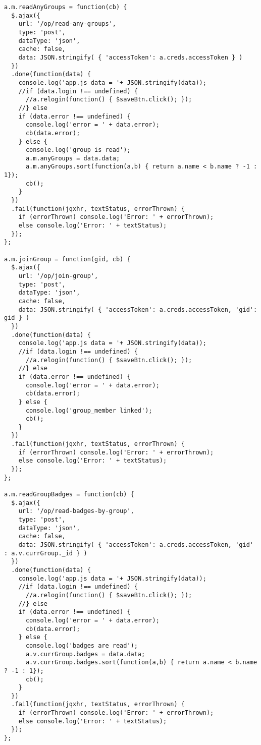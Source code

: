 \begin{lstlisting}
a.m.readAnyGroups = function(cb) { 
  $.ajax({
    url: '/op/read-any-groups',
    type: 'post',
    dataType: 'json',
    cache: false,
    data: JSON.stringify( { 'accessToken': a.creds.accessToken } )
  })
  .done(function(data) {
    console.log('app.js data = '+ JSON.stringify(data));
    //if (data.login !== undefined) {
      //a.relogin(function() { $saveBtn.click(); });
    //} else 
    if (data.error !== undefined) {
      console.log('error = ' + data.error);
      cb(data.error);
    } else {
      console.log('group is read');
      a.m.anyGroups = data.data;
      a.m.anyGroups.sort(function(a,b) { return a.name < b.name ? -1 : 1});
      cb();
    }
  })
  .fail(function(jqxhr, textStatus, errorThrown) {
    if (errorThrown) console.log('Error: ' + errorThrown);
    else console.log('Error: ' + textStatus);
  });
}; 

a.m.joinGroup = function(gid, cb) { 
  $.ajax({
    url: '/op/join-group',
    type: 'post',
    dataType: 'json',
    cache: false,
    data: JSON.stringify( { 'accessToken': a.creds.accessToken, 'gid': gid } )
  })
  .done(function(data) {
    console.log('app.js data = '+ JSON.stringify(data));
    //if (data.login !== undefined) {
      //a.relogin(function() { $saveBtn.click(); });
    //} else 
    if (data.error !== undefined) {
      console.log('error = ' + data.error);
      cb(data.error);
    } else {
      console.log('group_member linked');
      cb();
    }
  })
  .fail(function(jqxhr, textStatus, errorThrown) {
    if (errorThrown) console.log('Error: ' + errorThrown);
    else console.log('Error: ' + textStatus);
  });
}; 

a.m.readGroupBadges = function(cb) { 
  $.ajax({
    url: '/op/read-badges-by-group',
    type: 'post',
    dataType: 'json',
    cache: false,
    data: JSON.stringify( { 'accessToken': a.creds.accessToken, 'gid' : a.v.currGroup._id } )
  })
  .done(function(data) {
    console.log('app.js data = '+ JSON.stringify(data));
    //if (data.login !== undefined) {
      //a.relogin(function() { $saveBtn.click(); });
    //} else 
    if (data.error !== undefined) {
      console.log('error = ' + data.error);
      cb(data.error);
    } else {
      console.log('badges are read');
      a.v.currGroup.badges = data.data;
      a.v.currGroup.badges.sort(function(a,b) { return a.name < b.name ? -1 : 1});
      cb();
    }
  })
  .fail(function(jqxhr, textStatus, errorThrown) {
    if (errorThrown) console.log('Error: ' + errorThrown);
    else console.log('Error: ' + textStatus);
  });
}; 


\end{lstlisting}
